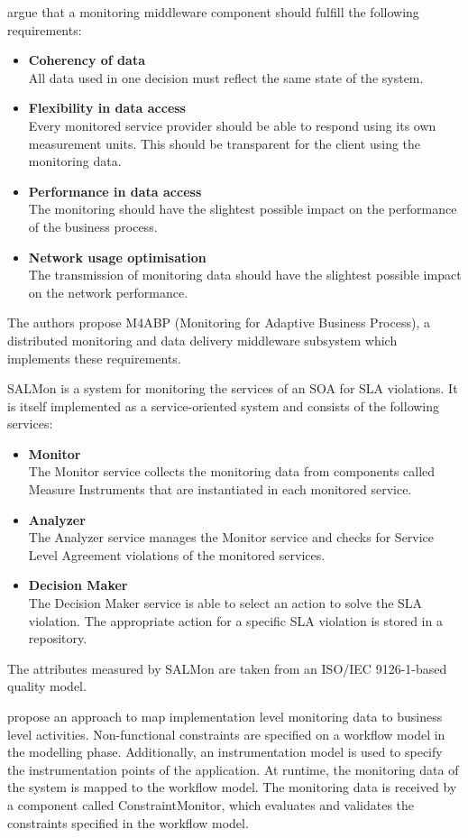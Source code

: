 \citet{Duc:2009kx} argue that a monitoring middleware component should fulfill the following requirements:
\begin{itemize}
	\item \textbf{Coherency of data}\\
	All data used in one decision must reflect the same state of the system.
	\item \textbf{Flexibility in data access}\\
	Every monitored service provider should be able to respond using its own measurement units. This should be transparent for the client using the monitoring data.
	\item \textbf{Performance in data access}\\
	The monitoring should have the slightest possible impact on the performance of the business process.
	\item \textbf{Network usage optimisation}\\
	The transmission of monitoring data should have the slightest possible impact on the network performance.
\end{itemize}
The authors propose M4ABP (Monitoring for Adaptive Business Process), a distributed monitoring and data delivery middleware subsystem which implements these requirements.

SALMon \citep{Ameller:2008zr} is a system for monitoring the services of an \ac{SOA} for \acf{SLA} violations. It is itself implemented as a service-oriented system and consists of the following services:
\begin{itemize}
	\item \textbf{Monitor}\\
	The Monitor service collects the monitoring data from components called Measure Instruments that are instantiated in each monitored service. 
	\item \textbf{Analyzer}\\
	The Analyzer service manages the Monitor service and checks for Service Level Agreement violations of the monitored services.
	\item \textbf{Decision Maker}\\
	The Decision Maker service is able to select an action to solve the SLA violation. The appropriate action for a specific SLA violation is stored in a repository.
\end{itemize}
The attributes measured by SALMon are taken from an ISO/IEC 9126-1-based quality model.

\citet{Textor:2009vn} propose an approach to map implementation level monitoring data to business level activities. Non-functional constraints are specified on a workflow model in the modelling phase. Additionally, an instrumentation model is used to specify the instrumentation points of the application. At runtime, the monitoring data of the system is mapped to the workflow model. 
The monitoring data is received by a component called ConstraintMonitor, which evaluates and validates the constraints specified in the workflow model.

